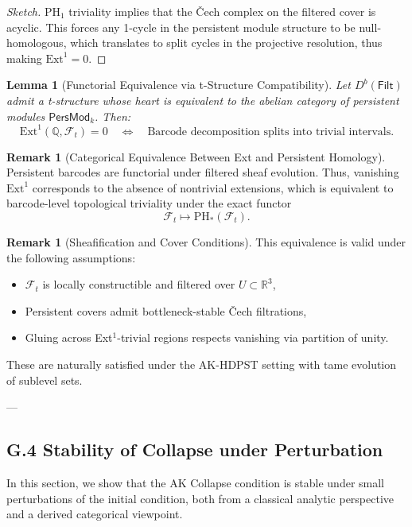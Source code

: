 \documentclass[11pt]{article}
\newtheorem{lemma}[theorem]{Lemma}
\theoremstyle{definition}
\newtheorem{remark}[theorem]{Remark}
\begin{document}
\begin{proof}[Sketch]
PH$_1$ triviality implies that the Čech complex on the filtered cover is acyclic.  
This forces any 1-cycle in the persistent module structure to be null-homologous,  
which translates to split cycles in the projective resolution, thus making \( \mathrm{Ext}^1 = 0 \).
\end{proof}

\begin{lemma}[Functorial Equivalence via t-Structure Compatibility]
Let \( D^b(\mathsf{Filt}) \) admit a t-structure whose heart is equivalent to the abelian category of persistent modules \( \mathsf{PersMod}_k \).  
Then:
\[
\mathrm{Ext}^1(\mathbb{Q}, \mathcal{F}_t) = 0 \quad \Leftrightarrow \quad \text{Barcode decomposition splits into trivial intervals}.
\]
\end{lemma}

\begin{remark}[Categorical Equivalence Between Ext and Persistent Homology]
Persistent barcodes are functorial under filtered sheaf evolution.  
Thus, vanishing $\mathrm{Ext}^1$ corresponds to the absence of nontrivial extensions,  
which is equivalent to barcode-level topological triviality under the exact functor  
\[
\mathcal{F}_t \longmapsto \mathrm{PH}_*(\mathcal{F}_t).
\]
\end{remark}

\begin{remark}[Sheafification and Cover Conditions]
This equivalence is valid under the following assumptions:
\begin{itemize}
  \item $\mathcal{F}_t$ is locally constructible and filtered over $U \subset \mathbb{R}^3$,
  \item Persistent covers admit bottleneck-stable Čech filtrations,
  \item Gluing across Ext$^1$-trivial regions respects vanishing via partition of unity.
\end{itemize}
These are naturally satisfied under the AK-HDPST setting with tame evolution of sublevel sets.
\end{remark}

---

\subsection*{G.4 Stability of Collapse under Perturbation}

In this section, we show that the AK Collapse condition is stable under small perturbations of the initial condition, both from a classical analytic perspective and a derived categorical viewpoint.
\end{document}

